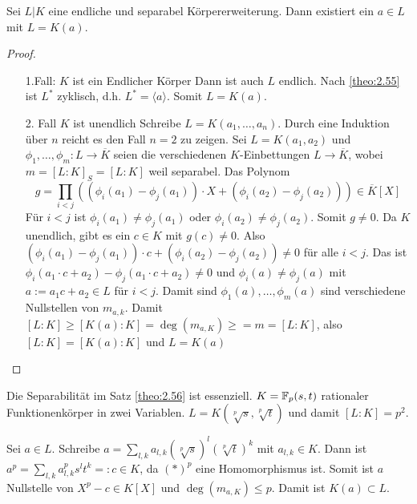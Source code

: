\documentclass[../main.tex]{subfiles}
\begin{document}
\begin{theorem} \label{theo:2.56}
    Sei $L|K$ eine endliche und separabel Körpererweiterung.
    Dann existiert ein $a\in L$ mit $L=K(a)$.
\end{theorem}
\begin{proof} $ $
    \begin{enumerate}[align=left]
        \item [1.Fall: $K$ ist ein Endlicher Körper] 
        Dann ist auch $L$ endlich. Nach \cref{theo:2.55} ist $L^*$ zyklisch, d.h. $L^*=\langle a\rangle$. 
        Somit $L=K(a)$.
        
        \item [2. Fall $K$ ist unendlich]
        Schreibe $L=K(a_1, \dots, a_n)$. Durch eine Induktion über $n$ reicht es den Fall $n=2$ zu zeigen.
        Sei $L = K(a_1,a_2)$ und $\phi_1,\dots,\phi_m: L\rightarrow \overline{K}$ seien die verschiedenen $K$-Einbettungen $L\rightarrow \overline{K}$, wobei $m=[L:K]_S=[L:K]$ weil separabel.
        Das Polynom $$g = \prod_{i<j} \left(\left(\phi_i\left(a_1\right)-\phi_j\left(a_1\right)\right)\cdot X + \left(\phi_i\left(a_2\right)-\phi_j\left(a_2\right)\right)\right)\in \overline{K}[X]$$
        Für $i<j$ ist $\phi_i(a_1)\neq \phi_j(a_1)$ oder $\phi_i(a_2)\neq\phi_j(a_2)$.
        Somit $g\neq 0$.
        Da $K$ unendlich, gibt es ein $c\in K$ mit $g(c)\neq 0$.
        Also $(\phi_i(a_1)-\phi_j(a_1))\cdot c + (\phi_i(a_2)-\phi_j(a_2)) \neq 0$ für alle $i<j$.
        Das ist $\phi_i(a_1 \cdot c + a_2)- \phi_j(a_1\cdot c + a_2) \neq 0$ und $\phi_i(a) \neq \phi_j(a)$ mit $a := a_1c+a_2\in L$ für $i<j$.
        Damit sind $\phi_1(a),\dots,\phi_m(a)$ sind verschiedene Nullstellen von $m_{a,k}$.
        Damit $[L:K] \geq [K(a):K] = \deg(m_{a,K}) \geq = m = [L:K]$, also $[L:K] = [K(a):K]$ und $L=K(a)$
    \end{enumerate}
\end{proof}
\begin{example}
    Die Separabilität im Satz \cref{theo:2.56} ist essenziell.
    $K=\mathbb{F}_p(s,t)$ rationaler Funktionenkörper in zwei Variablen.
    $L=K(\sqrt[p]{s},\sqrt[p]{t})$ und damit $[L:K] = p^2$. \TODO[Graphik]

    Sei $a\in L$.
    Schreibe $a = \sum_{l,k} a_{l,k} (\sqrt[p]{s})^l(\sqrt[p]{t})^k$ mit $a_{l,k}\in K$.
    Dann ist $a^p=\sum_{l,k} a_{l,k}^p s^l t^k =: c\in K$, da $(*)^p$ eine Homomorphismus ist.
    Somit ist $a$ Nullstelle von $X^p-c\in K[X]$ und $\deg(m_{a,K}) \leq p$.
    Damit ist $K(a)\subset L$.
\end{example}
\end{document}
